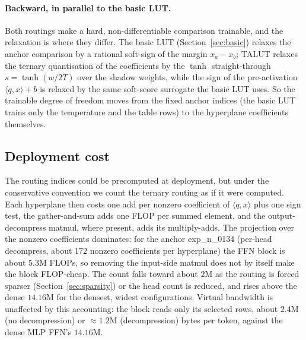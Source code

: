 \documentclass[11pt]{article}
\begin{document}
\paragraph{Backward, in parallel to the basic LUT.} Both routings make a hard, non-differentiable
comparison trainable, and the relaxation is where they differ. The basic LUT
(Section~\ref{sec:basic}) relaxes the anchor comparison by a rational soft-sign of the margin
$x_{a}-x_{b}$; TALUT relaxes the ternary quantisation of the coefficients by the $\tanh$
straight-through $s=\tanh(w/2T)$ over the shadow weights, while the sign of the pre-activation
$\langle q,x\rangle+b$ is relaxed by the same soft-score surrogate the basic LUT uses. So the
trainable degree of freedom moves from the fixed anchor indices (the basic LUT trains only the
temperature and the table rows) to the hyperplane coefficients themselves.

\subsection{Deployment cost}
\label{sec:deploy}
The routing indices could be precomputed at deployment, but under the conservative convention we
count the ternary routing as if it were computed. Each hyperplane then costs one add per nonzero
coefficient of $\langle q,x\rangle$ plus one sign test, the gather-and-sum adds one FLOP per
summed element, and the output-decompress matmul, where present, adds its multiply-adds. The
projection over the nonzero coefficients dominates: for the anchor exp\_n\_0134 (per-head
decompress, about $172$ nonzero coefficients per hyperplane) the FFN block is about $5.3$M FLOPs,
so removing the input-side matmul does not by itself make the block FLOP-cheap. The count falls
toward about $2$M as the routing is forced sparser (Section~\ref{sec:sparsity}) or the head count
is reduced, and rises above the dense $14.16$M for the densest, widest configurations. Virtual
bandwidth is unaffected by this accounting: the block reads only its selected rows, about $2.4$M
(no decompression) or $\approx 1.2$M (decompression) bytes per token, against the dense MLP FFN's
$14.16$M.
\end{document}
